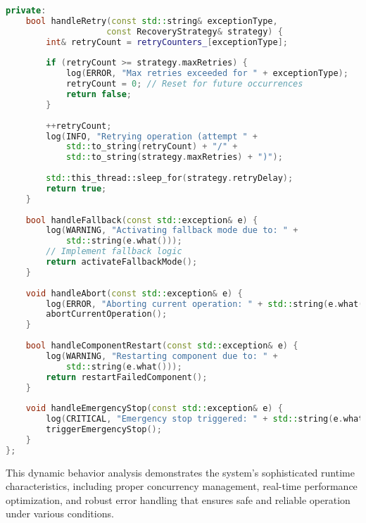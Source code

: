 \begin{lstlisting}[language=C++, caption=Error Recovery Implementation]
private:
    bool handleRetry(const std::string& exceptionType, 
                    const RecoveryStrategy& strategy) {
        int& retryCount = retryCounters_[exceptionType];
        
        if (retryCount >= strategy.maxRetries) {
            log(ERROR, "Max retries exceeded for " + exceptionType);
            retryCount = 0; // Reset for future occurrences
            return false;
        }
        
        ++retryCount;
        log(INFO, "Retrying operation (attempt " + 
            std::to_string(retryCount) + "/" + 
            std::to_string(strategy.maxRetries) + ")");
        
        std::this_thread::sleep_for(strategy.retryDelay);
        return true;
    }
    
    bool handleFallback(const std::exception& e) {
        log(WARNING, "Activating fallback mode due to: " + 
            std::string(e.what()));
        // Implement fallback logic
        return activateFallbackMode();
    }
    
    void handleAbort(const std::exception& e) {
        log(ERROR, "Aborting current operation: " + std::string(e.what()));
        abortCurrentOperation();
    }
    
    bool handleComponentRestart(const std::exception& e) {
        log(WARNING, "Restarting component due to: " + 
            std::string(e.what()));
        return restartFailedComponent();
    }
    
    void handleEmergencyStop(const std::exception& e) {
        log(CRITICAL, "Emergency stop triggered: " + std::string(e.what()));
        triggerEmergencyStop();
    }
};
\end{lstlisting}

This dynamic behavior analysis demonstrates the system's sophisticated runtime characteristics, including proper concurrency management, real-time performance optimization, and robust error handling that ensures safe and reliable operation under various conditions.
